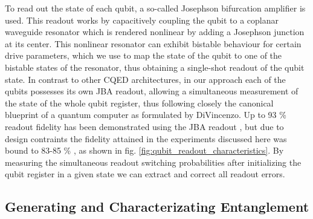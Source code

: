 To read out the state of each qubit, a so-called Josephson bifurcation amplifier \citep{siddiqi_dispersive_2006,mallet_single-shot_2009} is used. This readout works by capacitively coupling the qubit to a coplanar waveguide resonator which is rendered nonlinear by adding a Josephson junction at its center. This nonlinear resonator can exhibit bistable behaviour for certain drive parameters, which we use to map the state of the qubit to one of the bistable states of the resonator, thus obtaining a single-shot readout of the qubit state. In contrast to other CQED architectures, in our approach each of the qubits possesses its own JBA readout, allowing a simultaneous measurement of the state of the whole qubit register, thus following closely the canonical blueprint of a quantum computer as formulated by DiVincenzo. Up to 93 \% readout fidelity has been demonstrated using the JBA readout \citep{mallet_single-shot_2009}, but due to design contraints the fidelity attained in the experiments discussed here was bound to 83-85 \% , as shown in fig. \ref{fig:qubit_readout_characteristics}. By measuring the simultaneous readout switching probabilities after initializing the qubit register in a given state we can extract and correct all readout errors.

\subsection{Generating and Characterizating Entanglement}

